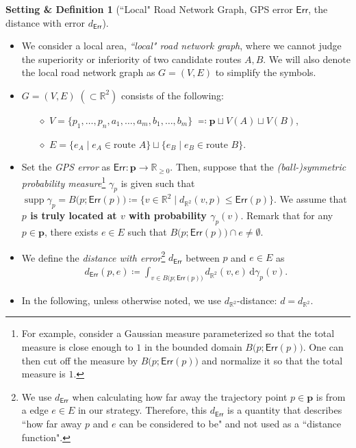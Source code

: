 \documentclass{article}
\numberwithin{equation}{section}
\theoremstyle{definition}
\newtheorem{setdef}[setdef]{Setting \& Definition}
\newcommand{\dd}{\mathrm{d}}
\newcommand{\err}{\mathsf{Err}}
\newcommand{\R}{\mathbb{R}}
\DeclareMathOperator\supp{supp} %
\def\:={\coloneqq} %
\begin{document}
\begin{setdef}[``Local" Road Network Graph, GPS error $\err$, the distance with error $d_\err$] \label{setdef}
$ $\newline
\begin{itemize} \vspace{-6mm}
\item We consider a local area, \emph{``local" road network graph}, where we cannot judge the superiority or inferiority of two candidate routes $A,B$.
We will also denote the local road network graph as $G=(V,E)$ to simplify the symbols. \\ \vspace{-5mm}
\item $G=(V,E)\;(\subset\R^2)$ consists of the following:
\begin{itemize} \vspace{-2mm}
    \item[$\diamond$] $V = \{p_1,\ldots,p_n,a_1,\dots,a_m,b_1,\dots,b_m\} \; \eqqcolon \mathbf{p}\sqcup V(A)\sqcup V(B)$,
    \item[$\diamond$] $E = \{e_A \;|\; e_A\in\text{route }A\} \sqcup \{e_B \;|\; e_B\in\text{route }B\}$.
\end{itemize} 
\item Set the \emph{GPS error} as $\err:\mathbf{p}\to\R_{\ge0}$.
Then, suppose that the \emph{(ball-)symmetric probability measure}\footnote{
For example, consider a Gaussian measure parameterized so that the total measure is close enough to $1$ in the bounded domain $B\big(p;\err(p)\big)$.
One can then cut off the measure by $B\big(p;\err(p)\big)$ and normalize it so that the total measure is $1$.}
$\gamma_p$ is given such that $\supp\gamma_p=B\big(p;\err(p)\big)\:=\{v\in\R^2\;|\;d_{\R^2}(v,p)\leq\err(p)\}$.
We assume that \textbf{$p$ is truly located at $v$ with probability $\gamma_p(v)$}.
Remark that for any $p\in\mathbf{p}$, there exists $e\in E$ such that $B\big(p;\err(p)\big)\cap e\neq\emptyset$.
\item We define the \emph{distance with error}\footnote{
We use $d_\err$ when calculating how far away the trajectory point $p\in\mathbf{p}$ is from a edge $e\in E$ in our strategy.
Therefore, this $d_\err$ is a quantity that describes ``how far away $p$ and $e$ can be considered to be" and not used as a ``distance function".}
$d_\err$ between $p$ and $e\in E$ as 
\begin{align*}
    d_\err(p,e) \:= \int_{v\in B\big(p;\err(p)\big)} d_{\R^2}(v,e)\, \dd\gamma_p(v).
\end{align*}
\item In the following, unless otherwise noted, we use $d_{\R^2}$-distance: $d=d_{\R^2}$.
\end{itemize}
\end{setdef}
\end{document}
